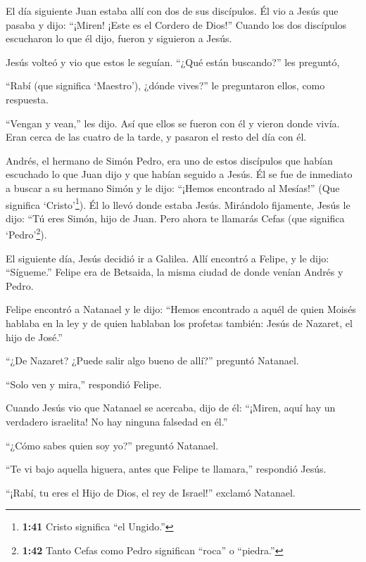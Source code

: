  El día siguiente Juan estaba allí con dos de sus
discípulos.  Él vio a Jesús que pasaba y dijo: ``¡Miren!
¡Este es el Cordero de Dios!''  Cuando los dos discípulos
escucharon lo que él dijo, fueron y siguieron a Jesús.

 Jesús volteó y vio que estos le seguían. ``¿Qué están
buscando?'' les preguntó,

``Rabí (que significa `Maestro'), ¿dónde vives?'' le preguntaron ellos,
como respuesta.

 ``Vengan y vean,'' les dijo. Así que ellos se fueron con
él y vieron donde vivía. Eran cerca de las cuatro de la tarde, y pasaron
el resto del día con él.

 Andrés, el hermano de Simón Pedro, era uno de estos
discípulos que habían escuchado lo que Juan dijo y que habían seguido a
Jesús.  Él se fue de inmediato a buscar a su hermano Simón
y le dijo: ``¡Hemos encontrado al Mesías!'' (Que significa
`Cristo'\footnote{\textbf{1:41} Cristo significa ``el Ungido.''}).
 Él lo llevó donde estaba Jesús. Mirándolo fijamente, Jesús
le dijo: ``Tú eres Simón, hijo de Juan. Pero ahora te llamarás Cefas
(que significa `Pedro'\footnote{\textbf{1:42} Tanto Cefas como Pedro
  significan ``roca'' o ``piedra.''}).

 El siguiente día, Jesús decidió ir a Galilea. Allí
encontró a Felipe, y le dijo: ``Sígueme.''  Felipe era de
Betsaida, la misma ciudad de donde venían Andrés y Pedro.

 Felipe encontró a Natanael y le dijo: ``Hemos encontrado a
aquél de quien Moisés hablaba en la ley y de quien hablaban los profetas
también: Jesús de Nazaret, el hijo de José.''

 ``¿De Nazaret? ¿Puede salir algo bueno de allí?'' preguntó
Natanael.

``Solo ven y mira,'' respondió Felipe.

 Cuando Jesús vio que Natanael se acercaba, dijo de él:
``¡Miren, aquí hay un verdadero israelita! No hay ninguna falsedad en
él.''

 ``¿Cómo sabes quien soy yo?'' preguntó Natanael.

``Te vi bajo aquella higuera, antes que Felipe te llamara,'' respondió
Jesús.

 ``¡Rabí, tu eres el Hijo de Dios, el rey de Israel!''
exclamó Natanael.

